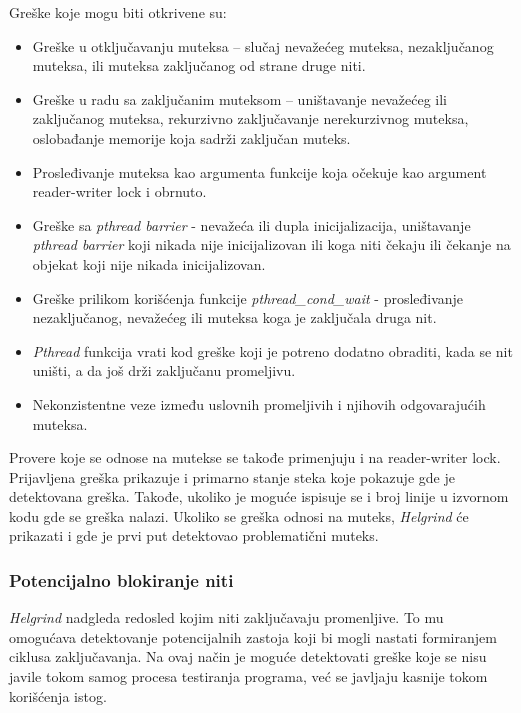 \documentclass[12pt,oneside]{memoir}
\theoremstyle{plain}
\theoremstyle{definition}
\begin{document}
Greške koje mogu biti otkrivene su:
\begin{itemize}
\item Greške u otključavanju muteksa – slučaj nevažećeg muteksa, nezaključanog muteksa, ili muteksa zaključanog od strane druge niti.
\item Greške u radu sa zaključanim muteksom – uništavanje nevažećeg ili zaključanog muteksa, rekurzivno zaključavanje nerekurzivnog muteksa, oslobađanje memorije koja sadrži zaključan muteks.
\item Prosleđivanje muteksa kao argumenta funkcije koja očekuje kao argument reader-writer lock i obrnuto.
\item Greške sa \textit{pthread barrier} - nevažeća ili dupla inicijalizacija, uništavanje \textit{pthread barrier} koji nikada nije inicijalizovan ili koga niti čekaju ili čekanje na objekat koji nije nikada inicijalizovan.
\item Greške prilikom korišćenja funkcije \textit{pthread\_cond\_wait} - prosleđivanje nezaključanog, nevažećeg ili muteksa koga je zaključala druga nit.
\item \textit{Pthread} funkcija vrati kod greške koji je potreno dodatno obraditi, kada se nit uništi, a da još drži zaključanu promeljivu.
\item Nekonzistentne veze između uslovnih promeljivih i njihovih odgovarajućih muteksa.
\end{itemize}

Provere koje se odnose na mutekse se takođe primenjuju i na reader-writer lock. Prijavljena greška prikazuje i primarno stanje steka koje pokazuje gde je detektovana greška. Takođe, ukoliko je moguće ispisuje se i broj linije u izvornom  kodu gde se greška nalazi. Ukoliko se greška odnosi na muteks, \textit{Helgrind} će prikazati i gde je prvi put detektovao problematični muteks.


\subsubsection{Potencijalno blokiranje niti}
\textit{Helgrind} nadgleda redosled kojim niti zaključavaju promenljive. To mu omogućava detektovanje potencijalnih zastoja koji bi mogli nastati formiranjem ciklusa zaključavanja. Na ovaj način je moguće detektovati greške koje se nisu javile tokom samog procesa testiranja programa, već se javljaju kasnije tokom korišćenja istog.
\end{document}
